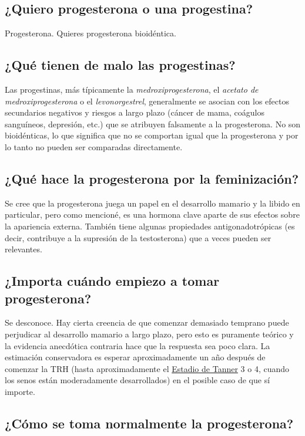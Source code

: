 \documentclass{article}
\begin{document}
\subsection{¿Quiero progesterona o una progestina?}

Progesterona. Quieres progesterona bioidéntica.

\subsection{¿Qué tienen de malo las progestinas?}

Las progestinas, más típicamente la \textit{medroxiprogesterona}, el \textit{acetato de medroxiprogesterona} o el \textit{levonorgestrel}, generalmente se asocian con los efectos secundarios negativos y riesgos a largo plazo (cáncer de mama, coágulos sanguíneos, depresión, etc.) que se atribuyen falsamente a la progesterona. No son bioidénticas, lo que significa que no se comportan igual que la progesterona y por lo tanto no pueden ser comparadas directamente.

\subsection{¿Qué hace la progesterona por la feminización?}

Se cree que la progesterona juega un papel en el desarrollo mamario y la libido en particular, pero como mencioné, es una hormona clave aparte de sus efectos sobre la apariencia externa. También tiene algunas propiedades antigonadotrópicas (es decir, contribuye a la supresión de la testosterona) que a veces pueden ser relevantes.

\subsection{¿Importa cuándo empiezo a tomar progesterona?}

Se desconoce. Hay cierta creencia de que comenzar demasiado temprano puede perjudicar al desarrollo mamario a largo plazo, pero esto es puramente teórico y la evidencia anecdótica contraria hace que la respuesta sea poco clara. La estimación conservadora es esperar aproximadamente un año después de comenzar la TRH (hasta aproximadamente el \href{https://en.wikipedia.org/wiki/File:Tanner_scale-female.svg}{Estadio de Tanner} 3 o 4, cuando los senos están moderadamente desarrollados) en el posible caso de que sí importe.

\subsection{¿Cómo se toma normalmente la progesterona?}
\end{document}
